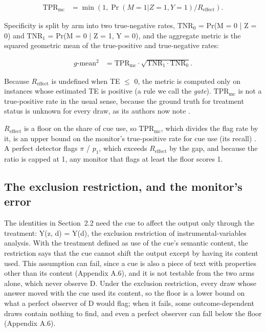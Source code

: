 \documentclass[11pt,a4paper]{article}
\begin{document}
\begin{align*}
  \mathrm{TPR}_{\mathrm{mc}} &= \min(1, \Pr(M = 1 | Z = 1, Y = 1) / R_{\mathrm{effect}}).
\end{align*}

Specificity is split by arm into two true-negative rates, $\mathrm{TNR}_0$ = Pr(M = 0 | Z = 0) and $\mathrm{TNR}_1$ = Pr(M = 0 | Z = 1, Y = 0), and the aggregate metric is the squared geometric mean of the true-positive and true-negative rates:

\begin{align*}
  g\text{-}\mathrm{mean}^2 &= \mathrm{TPR}_{\mathrm{mc}} \cdot  \sqrt{\mathrm{TNR}_1 \cdot  \mathrm{TNR}_0}.
\end{align*}

Because $R_{\mathrm{effect}}$ is undefined when TE $\leq$ 0, the metric is computed only on instances whose estimated TE is positive (a rule we call the \emph{gate}). $\mathrm{TPR}_{\mathrm{mc}}$ is not a true-positive rate in the usual sense, because the ground truth for treatment status is unknown for every draw, as its authors now note \citep*{guan2026beyond}.

$R_{\mathrm{effect}}$ is a floor on the share of cue use, so $\mathrm{TPR}_{\mathrm{mc}}$, which divides the flag rate by it, is an upper bound on the monitor’s true-positive rate for cue use (its recall) \citep*{guan2026beyond}. A perfect detector flags $\pi$ / $p_1$, which exceeds $R_{\mathrm{effect}}$ by the gap, and because the ratio is capped at 1, any monitor that flags at least the floor scores 1.

\subsection{The exclusion restriction, and the monitor’s error}
The identities in Section~2.2 need the cue to affect the output only through the treatment: Y(z, d) = Y(d), the exclusion restriction of instrumental-variables analysis. With the treatment defined as use of the cue’s semantic content, the restriction says that the cue cannot shift the output except by having its content used. This assumption can fail, since a cue is also a piece of text with properties other than its content (Appendix A.6), and it is not testable from the two arms alone, which never observe D. Under the exclusion restriction, every draw whose answer moved with the cue used its content, so the floor is a lower bound on what a perfect observer of D would flag; when it fails, some outcome-dependent draws contain nothing to find, and even a perfect observer can fall below the floor (Appendix A.6).
\end{document}
